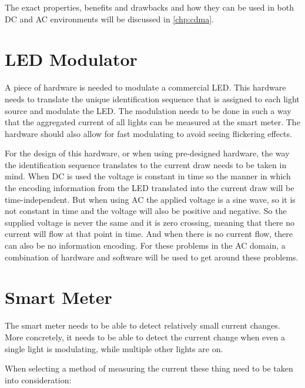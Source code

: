 	The exact properties, benefits and drawbacks and how they can be used in both DC and AC environments will be discussed in \autoref{chp:cdma}.




	\section{LED Modulator}

	A piece of hardware is needed to modulate a commercial LED.
	This hardware needs to translate the unique identification sequence that is assigned to each light source and modulate the LED.
	The modulation needs to be done in such a way that the aggregated current of all lights can be measured at the smart meter.  
	The hardware should also allow for fast modulating to avoid seeing flickering effects.


	For the design of this hardware, or when using pre-designed hardware, the way the identification sequence translates to the current draw needs to be taken in mind. 
	When DC is used the voltage is constant in time so the manner in which the encoding information from the LED translated into the current draw will be time-independent.
	But when using AC the applied voltage is a sine wave, so it is not constant in time and the voltage will also be positive and negative.
	So the supplied voltage is never the same and it is zero crossing, meaning that there no current will flow at that point in time.
	And when there is no current flow, there can also be no information encoding.
	For these problems in the AC domain, a combination of hardware and software will be used to get around these problems.



	\section{Smart Meter}

	The smart meter needs to be able to detect relatively small current changes.
	More concretely, it needs to be able to detect the current change when even a single light is modulating, while multiple other lights are on.

	When selecting a method of measuring the current these thing need to be taken into consideration:

